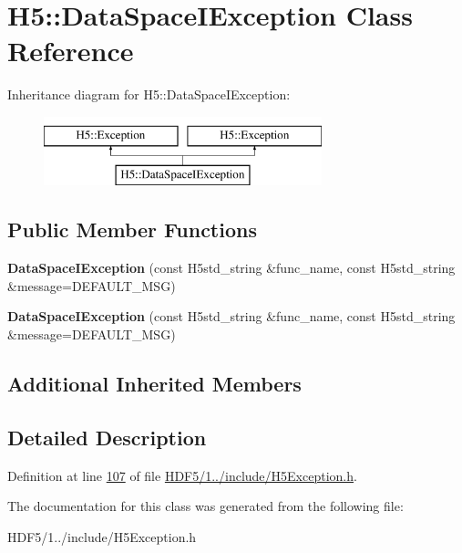 \hypertarget{class_h5_1_1_data_space_i_exception}{}\section{H5\+:\+:Data\+Space\+I\+Exception Class Reference}
\label{class_h5_1_1_data_space_i_exception}
Inheritance diagram for H5\+:\+:Data\+Space\+I\+Exception\+:\begin{figure}[H]
\begin{center}
\leavevmode
\includegraphics[height=2.000000cm]{class_h5_1_1_data_space_i_exception}
\end{center}
\end{figure}
\subsection*{Public Member Functions}
\begin{DoxyCompactItemize}
\item 
\mbox{\label{class_h5_1_1_data_space_i_exception_acf12b17c297f1b9f67f3f92916df94e5}} 
{\bfseries Data\+Space\+I\+Exception} (const H5std\+\_\+string \&func\+\_\+name, const H5std\+\_\+string \&message=D\+E\+F\+A\+U\+L\+T\+\_\+\+M\+SG)
\item 
\mbox{\label{class_h5_1_1_data_space_i_exception_acf12b17c297f1b9f67f3f92916df94e5}} 
{\bfseries Data\+Space\+I\+Exception} (const H5std\+\_\+string \&func\+\_\+name, const H5std\+\_\+string \&message=D\+E\+F\+A\+U\+L\+T\+\_\+\+M\+SG)
\end{DoxyCompactItemize}
\subsection*{Additional Inherited Members}


\subsection{Detailed Description}


Definition at line \hyperlink{_h_d_f5_21_810_81_2include_2_h5_exception_8h_source_l00107}{107} of file \hyperlink{_h_d_f5_21_810_81_2include_2_h5_exception_8h_source}{H\+D\+F5/1../include/\+H5\+Exception.\+h}.



The documentation for this class was generated from the following file\+:\begin{DoxyCompactItemize}
\item 
H\+D\+F5/1../include/\+H5\+Exception.\+h\end{DoxyCompactItemize}
